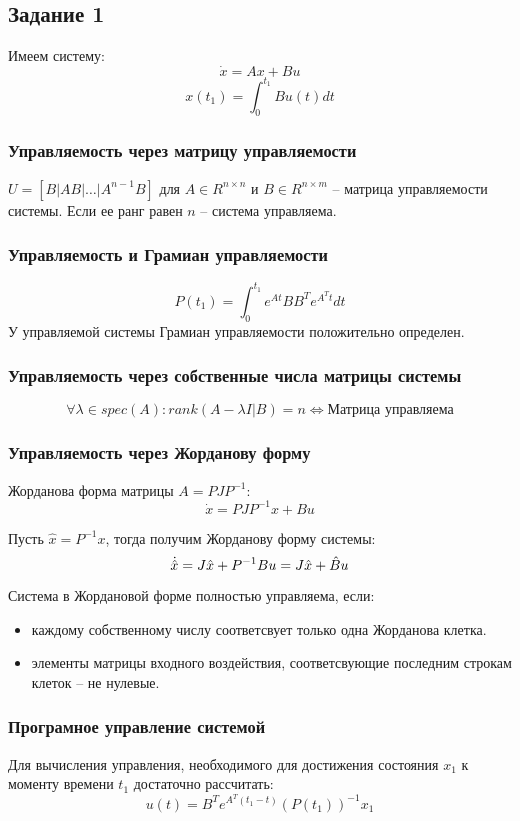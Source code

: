 \subsection{Задание 1}
Имеем систему:
\[\dot{x} = A x + Bu \]
\[x(t_1) = \int_0^{t_1} B u(t) dt\]
\subsubsection{Управляемость через матрицу управляемости}
\(U = [B | AB | \hdots | A^{n-1}B]\) для \(A \in R^{n \times n}\) и \(B \in R^{n \times m}\) -- матрица управляемости системы. Если ее ранг равен \(n\) -- система управляема.

\subsubsection{Управляемость и Грамиан управляемости}
\[P(t_1) = \int_0^{t_1} e^{At} B B^T e^{A^T t} dt\]
У управляемой системы Грамиан управляемости положительно определен.

\subsubsection{Управляемость через собственные числа матрицы системы}
\[\forall \lambda \in spec(A): rank(A - \lambda I | B) = n \Longleftrightarrow \text{Матрица управляема} \]

\subsubsection{Управляемость через Жорданову форму}
Жорданова форма матрицы \(A = P J P^{-1}\):
\[
        \dot{x} = P J P^{-1} x + Bu 
\]

Пусть \(\hat{x} = P^{-1}x\), тогда получим Жорданову форму системы:
\[
        \dot{\hat{x}} = J\hat{x} + P^{-1}Bu = J\hat{x} + \hat{B}u  \\
\]

Система в Жордановой форме полностью управляема, если:
\begin{itemize}
    \item каждому собственному числу соответсвует только одна Жорданова клетка. 
    \item элементы матрицы входного воздействия, соответсвующие последним строкам клеток -- не нулевые.
\end{itemize}

\subsubsection{Програмное управление системой}
Для вычисления управления, необходимого для достижения состояния \(x_1\) к моменту времени \(t_1\) достаточно рассчитать:
\[u(t) = B^T e^{A^T (t_1 - t)} (P(t_1))^{-1} x_1\]


